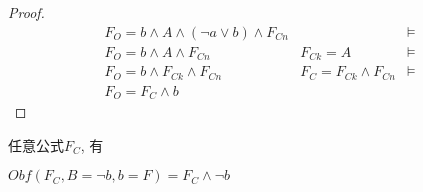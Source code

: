 \begin{proof}
\begin{equation}
\begin{array}{ccc}
F_O  =  b\wedge A \wedge (\neg a\vee b)\wedge F_{Cn}    &                          &\models\\
F_O  =  b\wedge A \wedge F_{Cn}                         &F_{Ck} =A                 &\models\\
F_O  =  b\wedge F_{Ck}\wedge F_{Cn}                     & F_C=F_{Ck} \wedge F_{Cn} &\models\\
F_O  =  F_C \wedge b                                    &   &
\end{array}
\end{equation}
\end{proof}

\begin{lemma}\label{UNSSE-lemma}
任意公式$F_C$, 有

 \textbf{$Obf(F_C,B=\neg b,{b=F})=F_C\wedge \neg b$}
\end{lemma}
